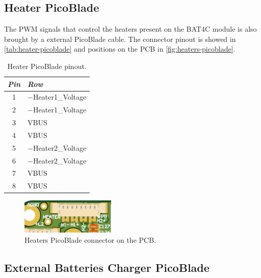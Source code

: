 \subsection{Heater PicoBlade} \label{heater-picoblade}

The PWM signals that control the heaters present on the BAT4C module is also brought by a external PicoBlade cable. The connector pinout is showed in \autoref{tab:heater-picoblade} and positions on the PCB in \autoref{fig:heaters-picoblade}.

\begin{table}[!h]
    \centering
    \begin{tabular}{cl}
        \toprule[1.5pt]
        \textit{Pin} & \textit{Row} \\
        \midrule
        1            & $-$Heater1\_Voltage \\
        2            & $-$Heater1\_Voltage \\
        3            & VBUS \\
        4            & VBUS \\
        5            & $-$Heater2\_Voltage \\
        6            & $-$Heater2\_Voltage \\
        7            & VBUS \\
        8            & VBUS \\
        \bottomrule[1.5pt]
    \end{tabular}
    \caption{Heater PicoBlade pinout.}
    \label{tab:heater-picoblade}
\end{table}

\begin{figure}[!ht]
    \begin{center}
        \includegraphics[width=0.4\textwidth]{figures/heaters-picoblade-3d.png}
        \caption{Heaters PicoBlade connector on the PCB.}
        \label{fig:heaters-picoblade}
    \end{center}
\end{figure}

\subsection{External Batteries Charger PicoBlade} \label{external-charge-picoblade}

